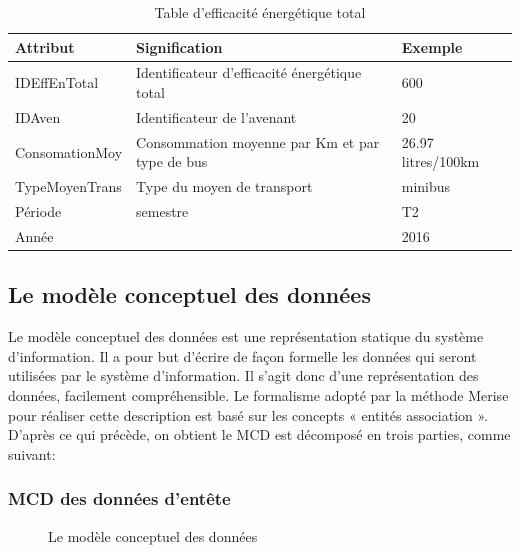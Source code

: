 \documentclass[a4paper]{report}
\begin{document}
\begin{doublespace}
	\begin{table}[H]
		\begin{center}
			\begin{tabularx}{17.5cm}{|p{4cm}|X|p{4cm}|}
				\hline
				\textbf{Attribut} & \textbf{Signification}                        &
				\textbf{Exemple}                                                            \\
				\hline
				IDEffEnTotal      & Identificateur d’efficacité énergétique total &
				600                                                                         \\
				\hline
				IDAven            & Identificateur de l'avenant                   & 20      \\
				\hline
				ConsomationMoy    & Consommation moyenne par Km et par type de bus &
				26.97 litres/100km                                                          \\
				\hline
				TypeMoyenTrans    & Type du moyen de transport                    & minibus \\
				\hline
				Période           & semestre                                      & T2      \\
				\hline
				Année             &                                               & 2016    \\
				\hline
			\end{tabularx}
			\caption{Table d’efficacité énergétique total}
		\end{center}
	\end{table}
	\subsection{Le modèle conceptuel des données}
	Le modèle conceptuel des données est une représentation statique du système d’information.
	Il a pour but d’écrire de façon formelle les données qui seront utilisées par le système d’information.
	Il s’agit donc d’une représentation des données, facilement compréhensible.
	Le formalisme adopté par la méthode Merise pour réaliser cette description est basé sur les concepts « entités association ».
	D’après ce qui précède, on obtient le MCD est décomposé en trois parties, comme suivant:
	\subsubsection{MCD des données d'entête}
	\begin{figure}[H]
		\begin{center}
			\caption{Le modèle conceptuel des données}
		\end{center}
	\end{figure}

\end{doublespace}
\end{document}
